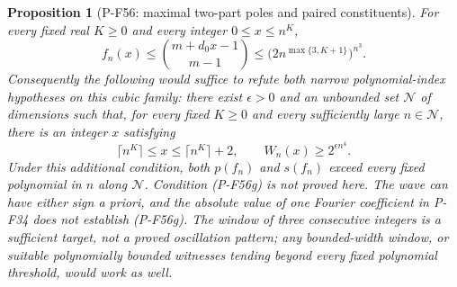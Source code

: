 \documentclass[11pt,a4paper]{article}
\newtheorem{proposition}{Proposition}[section]
\begin{document}
\begin{proposition}[P-F56: maximal two-part poles and paired constituents]
For every fixed real $K\ge0$ and every integer $0\le x\le n^K$,
\[
 f_n(x)\le\binom{m+d_0x-1}{m-1}
     \le\bigl(2n^{\max\{3,K+1\}}\bigr)^{n^3}.
 \tag{P-F56f}
\]
Consequently the following would suffice to refute both narrow
polynomial-index hypotheses on this cubic family: there exist
$\epsilon>0$ and an unbounded set $\mathcal N$ of dimensions
such that, for every fixed $K\ge0$ and every sufficiently large
$n\in\mathcal N$, there is an integer $x$ satisfying
\[
 \lceil n^K\rceil\le x\le\lceil n^K\rceil+2,
                         \qquad W_n(x)\ge2^{\epsilon n^4}.
 \tag{P-F56g}
\]
Under this additional condition, both $p(f_n)$ and $s(f_n)$
exceed every fixed polynomial in $n$ along $\mathcal N$.
Condition (P-F56g) is not proved here. The wave can have
either sign a priori, and the absolute value of one Fourier
coefficient in P-F34 does not establish (P-F56g).
The window of three consecutive integers is a sufficient
target, not a proved oscillation pattern; any bounded-width
window, or suitable polynomially bounded witnesses tending
beyond every fixed polynomial threshold, would work as well.
\end{proposition}
\end{document}
